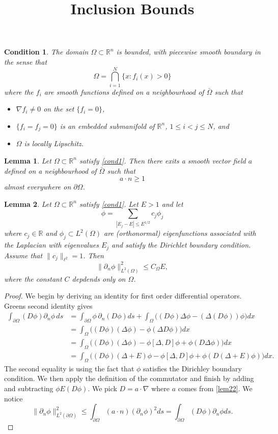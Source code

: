 \documentclass{article}
\title{Inclusion Bounds}
\newcommand{\R}{\mathbb{R}}
\newtheorem{lemma}{Lemma}\newcommand{\lemmaautorefname}{Lemma}
\newtheorem{cond}{Condition}\newcommand{\condautorefname}{Condition}
\begin{document}
\maketitle
\begin{cond}
\label{cond1}
The domain $\Omega \subset \R^n$ is bounded, with piecewise smooth boundary in the sense that
\[
\Omega = \bigcap_{i=1}^N\{x : f_i(x) > 0\}
\]
where the $f_i$ are smooth functions defined on a neighbourhood of $\bar\Omega$ such that
\begin{itemize}
\item $\nabla f_i \ne 0$ on the set $\{f_i = 0\}$,
\item $\{f_i = f_j = 0\}$ is an embedded submanifold of $\R^n$, $1 \le i < j \le N$, and
\item $\Omega$ is locally Lipschitz.
\end{itemize}
\end{cond}

\begin{lemma}
\label{lem22}
Let $\Omega \subset \R^n$ satisfy \autoref{cond1}.
Then there exits a smooth vector field $a$ defined on a neighbourhood of $\bar\Omega$ such that
\[
a \cdot n \ge 1
\]
almost everywhere on $\partial \Omega$.
\end{lemma}

\begin{lemma}
\label{lem21}
Let $\Omega \subset \R^n$ satisfy \autoref{cond1}.
Let $E > 1$ and let
\[
\phi = \sum_{|E_j - E| \le E^{1/2}} c_j \phi_j
\]
where $c_j \in \R$ and $\phi_j \subset L^2(\Omega)$ are (orthonormal) eigenfunctions associated with the Laplacian with eigenvalues $E_j$ and satisfy the Dirichlet boundary condition.
Assume that $\lVert c_j \rVert_{\ell^2} = 1$.
Then
\[
\lVert \partial_n \phi\rVert_{L^2(\Omega)}^2 \le C_\Omega E,
\]
where the constant $C$ depdends only on $\Omega$.
\end{lemma}
\begin{proof}
We begin by deriving an identity for first order differential operators.
Greens second identity gives
\begin{align*}
\int_{\partial \Omega} (D \phi) \partial_n \phi \, ds
& = \int_{\partial \Omega} \phi \, \partial_n (D \phi) ds + \int_{\Omega}  \Big((D \phi)\Delta \phi - (\Delta (D \phi)) \phi \Big) dx \\
& = \int_{\Omega} \Big((D \phi)(\Delta \phi) - \phi (\Delta D \phi)\Big) dx \\
& = \int_{\Omega} \Big((D \phi) (\Delta \phi) - \phi [\Delta, D] \phi + \phi (D \Delta \phi) \Big) dx \\
& = \int_{\Omega} \Big((D \phi) (\Delta + E) \phi - \phi [\Delta, D] \phi + \phi (D (\Delta + E) \phi) \Big) dx.
\end{align*}
The second equality is using the fact that $\phi$ satisfies the Dirichley boundary condition.
We then apply the definition of the commutator and finish by adding and subtracting $\phi E (D \phi)$.
We pick $D = a \cdot \nabla$ where $a$ comes from \autoref{lem22}.
We notice
\[
\lVert \partial_n \phi \rVert_{L^2(\partial \Omega)}^2
\le \int_{\partial \Omega} (a \cdot n) (\partial_n \phi)^2 ds
= \int_{\partial \Omega} (D \phi) \partial_n \phi ds.
\]
\end{proof}
\end{document}
